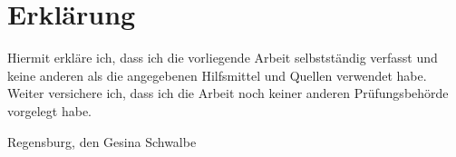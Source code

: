 \chapter*{Erklärung}

Hiermit erkläre ich, dass ich die vorliegende Arbeit selbstständig
verfasst und keine anderen als die angegebenen Hilfsmittel und Quellen
verwendet habe. Weiter versichere ich, dass ich die Arbeit noch keiner
anderen Prüfungsbehörde vorgelegt habe.


Regensburg, den \abgabedatum
\hfill*
Gesina Schwalbe


